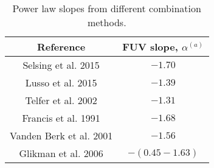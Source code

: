 \begin{table}
\centering
\begin{center}
\caption{Power law slopes from different combination methods. \label{tab:targets}}

\begin{tabular}{cc}
\hline
\noalign{\smallskip}
Reference &  FUV slope, $\alpha$$^{(a)}$ \\  
\hline


Selsing et al. 2015  & $-1.70$   \\
Lusso et al. 2015  & $-1.39$   \\
Telfer et al. 2002  & $-1.31$   \\
Francis et al. 1991  & $-1.68 $   \\

Vanden Berk et al. 2001  & $-1.56$   \\
Glikman et al. 2006 & $-(0.45 - 1.63)$   \\
\hline
\hline
\end{tabular}
\end{center}


\end{table}



